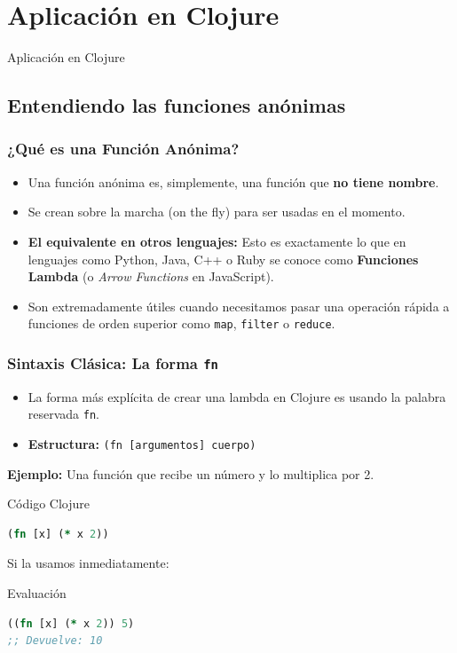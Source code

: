 \documentclass{beamer}
\begin{document}
\section{Aplicación en Clojure}

\begin{emptyframe}
    Aplicación en Clojure
\end{emptyframe}
\subsection{Entendiendo las funciones anónimas}

\begin{frame}
\frametitle{¿Qué es una Función Anónima?}
\begin{itemize}
    \item Una función anónima es, simplemente, una función que \textbf{no tiene nombre}.
    \item Se crean sobre la marcha (on the fly) para ser usadas en el momento.
    \item \textbf{El equivalente en otros lenguajes:} Esto es exactamente lo que en lenguajes como Python, Java, C++ o Ruby se conoce como \textbf{Funciones Lambda} (o \textit{Arrow Functions} en JavaScript).
    \item Son extremadamente útiles cuando necesitamos pasar una operación rápida a funciones de orden superior como \texttt{map}, \texttt{filter} o \texttt{reduce}.
\end{itemize}
\end{frame}

\begin{frame}[fragile]
\frametitle{Sintaxis Clásica: La forma \texttt{fn}}
\begin{itemize}
    \item La forma más explícita de crear una lambda en Clojure es usando la palabra reservada \texttt{fn}.
    \item \textbf{Estructura:} \texttt{(fn [argumentos] cuerpo)}
\end{itemize}
\vspace{0.5cm}
\textbf{Ejemplo:} Una función que recibe un número y lo multiplica por 2.
\begin{block}{Código Clojure}
\begin{lstlisting}[language=Clojure]
(fn [x] (* x 2))
\end{lstlisting}
\end{block}

Si la usamos inmediatamente:
\begin{block}{Evaluación}
\begin{lstlisting}[language=Clojure]
((fn [x] (* x 2)) 5) 
;; Devuelve: 10
\end{lstlisting}
\end{block}
\end{frame}
\end{document}
